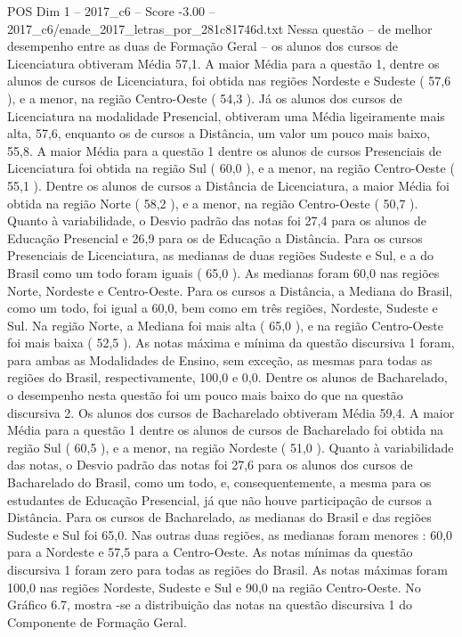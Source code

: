 \begin{textsample}{POS Dim 1 – 2017\_c6 – Score -3.00 – 2017\_c6/enade\_2017\_letras\_por\_281c81746d.txt}
Nessa questão – de melhor desempenho entre as duas de Formação Geral – os alunos dos cursos de Licenciatura obtiveram Média 57,1.
A maior Média para a questão 1, dentre os alunos de cursos de Licenciatura, foi obtida nas regiões Nordeste e Sudeste ( 57,6 ), e a menor, na região Centro-Oeste ( 54,3 ).
Já os alunos dos cursos de Licenciatura na modalidade Presencial, obtiveram uma Média ligeiramente mais alta, 57,6, enquanto os de cursos a Distância, um valor um pouco mais baixo, 55,8.
A maior Média para a questão 1 dentre os alunos de cursos Presenciais de Licenciatura foi obtida na região Sul ( 60,0 ), e a menor, na região Centro-Oeste ( 55,1 ).
Dentre os alunos de cursos a Distância de Licenciatura, a maior Média foi obtida na região Norte ( 58,2 ), e a menor, na região Centro-Oeste ( 50,7 ).
Quanto à variabilidade, o Desvio padrão das notas foi 27,4 para os alunos de Educação Presencial e 26,9 para os de Educação a Distância.
Para os cursos Presenciais de Licenciatura, as medianas de duas regiões Sudeste e Sul, e a do Brasil como um todo foram iguais ( 65,0 ).
As medianas foram 60,0 nas regiões Norte, Nordeste e Centro-Oeste.
Para os cursos a Distância, a Mediana do Brasil, como um todo, foi igual a 60,0, bem como em três regiões, Nordeste, Sudeste e Sul.
Na região Norte, a Mediana foi mais alta ( 65,0 ), e na região Centro-Oeste foi mais baixa ( 52,5 ).
As notas máxima e mínima da questão discursiva 1 foram, para ambas as Modalidades de Ensino, sem exceção, as mesmas para todas as regiões do Brasil, respectivamente, 100,0 e 0,0.
Dentre os alunos de Bacharelado, o desempenho nesta questão foi um pouco mais baixo do que na questão discursiva 2.
Os alunos dos cursos de Bacharelado obtiveram Média 59,4.
A maior Média para a questão 1 dentre os alunos de cursos de Bacharelado foi obtida na região Sul ( 60,5 ), e a menor, na região Nordeste ( 51,0 ).
Quanto à variabilidade das notas, o Desvio padrão das notas foi 27,6 para os alunos dos cursos de Bacharelado do Brasil, como um todo, e, consequentemente, a mesma para os estudantes de Educação Presencial, já que não houve participação de cursos a Distância.
Para os cursos de Bacharelado, as medianas do Brasil e das regiões Sudeste e Sul foi 65,0.
Nas outras duas regiões, as medianas foram menores : 60,0 para a Nordeste e 57,5 para a Centro-Oeste.
As notas mínimas da questão discursiva 1 foram zero para todas as regiões do Brasil.
As notas máximas foram 100,0 nas regiões Nordeste, Sudeste e Sul e 90,0 na região Centro-Oeste.
No Gráfico 6.7, mostra -se a distribuição das notas na questão discursiva 1 do Componente de Formação Geral.

\end{textsample}
